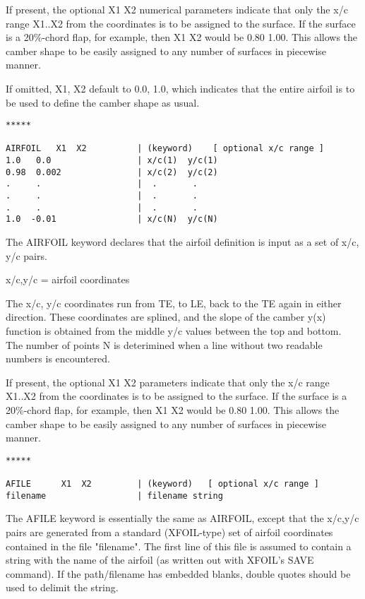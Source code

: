 If present, the optional X1 X2 numerical parameters indicate that only 
the x/c range X1..X2 from the coordinates is to be assigned to the surface.
If the surface is a 20\%-chord flap, for example, then X1 X2
would be 0.80 1.00.  This allows the camber shape to be easily 
assigned to any number of surfaces in piecewise manner.  

If omitted,  X1, X2  default to  0.0, 1.0, which indicates that the
entire airfoil is to be used to define the camber shape as usual.\\

\begin{lstlisting}
*****

AIRFOIL   X1  X2          | (keyword)    [ optional x/c range ]
1.0   0.0                 | x/c(1)  y/c(1)
0.98  0.002               | x/c(2)  y/c(2)
.     .                   |  .       .
.     .                   |  .       .
.     .                   |  .       .
1.0  -0.01                | x/c(N)  y/c(N)

\end{lstlisting}


The AIRFOIL keyword declares that the airfoil definition is input
as a set of x/c, y/c pairs.

x/c,y/c =  airfoil coordinates 

The x/c, y/c coordinates run from TE, to LE, back to the TE again 
in either direction.  These coordinates are splined, and the slope 
of the camber y(x) function is obtained from the middle y/c values 
between the top and bottom.  The number of points N is deterimined 
when a line without two readable numbers is encountered.

If present, the optional X1 X2 parameters indicate that only the 
x/c range X1..X2 from the coordinates is to be assigned to the surface.
If the surface is a 20\%-chord flap, for example, then X1 X2
would be 0.80 1.00.  This allows the camber shape to be easily 
assigned to any number of surfaces in piecewise manner.\\

\begin{lstlisting}
*****

AFILE      X1  X2         | (keyword)   [ optional x/c range ]
filename                  | filename string

\end{lstlisting}

The AFILE keyword is essentially the same as AIRFOIL, except
that the x/c,y/c pairs are generated from a standard (XFOIL-type)
set of airfoil coordinates contained in the file "filename".  
The first line of this file is assumed to contain a string
with the name of the airfoil (as written out with XFOIL's SAVE
command).   If the path/filename has embedded blanks,
double quotes should be used to delimit the string.

